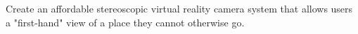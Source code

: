 Create an affordable stereoscopic virtual reality camera system that allows users a "first-hand" view of a place they cannot otherwise go.